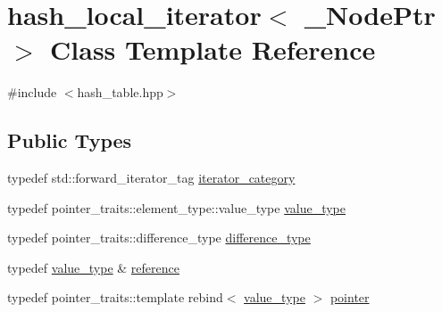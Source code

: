 \hypertarget{classhash__local__iterator}{}\section{hash\+\_\+local\+\_\+iterator$<$ \+\_\+\+Node\+Ptr $>$ Class Template Reference}
\label{classhash__local__iterator}


{\ttfamily \#include $<$hash\+\_\+table.\+hpp$>$}

\subsection*{Public Types}
\begin{DoxyCompactItemize}
\item 
typedef std\+::forward\+\_\+iterator\+\_\+tag \hyperlink{classhash__local__iterator_a317e8344fdb30a1260fcb6acbc6a4148}{iterator\+\_\+category}
\item 
typedef pointer\+\_\+traits\+::element\+\_\+type\+::value\+\_\+type \hyperlink{classhash__local__iterator_a2680e7b16ebe6ca20f14176a5756155c}{value\+\_\+type}
\item 
typedef pointer\+\_\+traits\+::difference\+\_\+type \hyperlink{classhash__local__iterator_a72aeabbbbe66592d0d7321c0df5e6d1d}{difference\+\_\+type}
\item 
typedef \hyperlink{classhash__local__iterator_a2680e7b16ebe6ca20f14176a5756155c}{value\+\_\+type} \& \hyperlink{classhash__local__iterator_a1d2a04128228b447eb0c026e5004f247}{reference}
\item 
typedef pointer\+\_\+traits\+::template rebind$<$ \hyperlink{classhash__local__iterator_a2680e7b16ebe6ca20f14176a5756155c}{value\+\_\+type} $>$ \hyperlink{classhash__local__iterator_a2916a4b3cab394878c6862b263e5841c}{pointer}
\end{DoxyCompactItemize}
